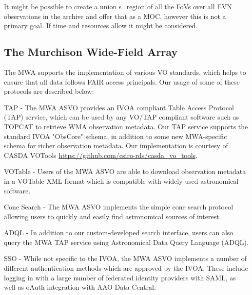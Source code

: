 \documentclass[11pt,a4paper]{ivoa}
\begin{document}
It might be possible to create a union s\_region of all the FoVs over all EVN observations in the archive and offer that as a MOC, however this is not a primary goal. If time and resources allow it might be considered.

\subsection{The Murchison Wide-Field Array}
\label{sec:MWA}
The MWA supports the implementation of various VO standards, which helps to ensure that all data follows FAIR access principals. Our usage of some of these protocols are described below:

TAP - The MWA ASVO provides an IVOA compliant Table Access Protocol (TAP) service, which can be used by any VO/TAP compliant software such as TOPCAT to retrieve WMA observation metadata. Our TAP service supports the standard IVOA "ObsCore" schema, in addition to some new MWA-specific schema for richer observation metadata. Our implementation is courtesy of CASDA VOTools \url{https://github.com/csiro-rds/casda_vo_tools}.

VOTable - Users of the MWA ASVO are able to download observation metadata in a VOTable XML format which is compatible with widely used astronomical software.

Cone Search - The MWA ASVO implements the simple cone search protocol allowing users to quickly and easily find astronomical sources of interest.

ADQL - In addition to our custom-developed search interface, users can also query the MWA TAP service using Astronomical Data Query Language (ADQL).

SSO - While not specific to the IVOA, the MWA ASVO implements a number of different authentication methods which are approved by the IVOA. These include logging in with a large number of federated identity providers with SAML, as well as oAuth integration with AAO Data Central.
\end{document}
